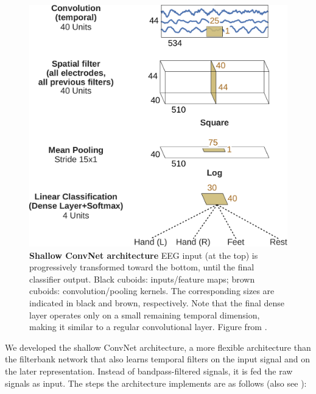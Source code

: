 \begin{figure}[ht]
    \myfloatalign
    \includegraphics[width=0.65\linewidth]{images/3D_Diagram_MatplotLib.ipynb.0.png}
    \caption[Shallow ConvNet architecture]{
    \textbf{Shallow ConvNet architecture} EEG input (at the top) is
progressively transformed toward the bottom, until the final classifier
output. Black cuboids: inputs/feature maps; brown cuboids:
convolution/pooling kernels. The corresponding sizes are indicated in
black and brown, respectively. Note that the final dense layer operates
only on a small remaining temporal dimension, making it similar to a
regular convolutional layer. Figure from
\citet{schirrmeisterdeephbm2017}.}\label{shallow-net-figure}
\end{figure}



    We developed the shallow ConvNet architecture, a more flexible
architecture than the filterbank network that also learns temporal
filters on the input signal and on the later representation. Instead of
bandpass-filtered signals, it is fed the raw signals as input. The steps
the architecture implements are as follows (also see ):

